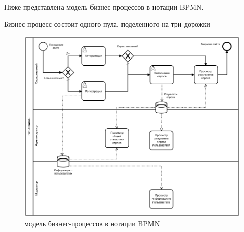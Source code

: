Ниже представлена модель бизнес-процессов в нотации BPMN.

Бизнес-процесс состоит одного пула, поделенного на три дорожки --
\begin{center}
	\begin{figure}[H]
		\centering
		\includegraphics[width=\linewidth]{assets/term-bpmn.png}
		\caption{модель бизнес-процессов в нотации BPMN}
		\label{fig:bpmn}
	\end{figure}
\end{center}

